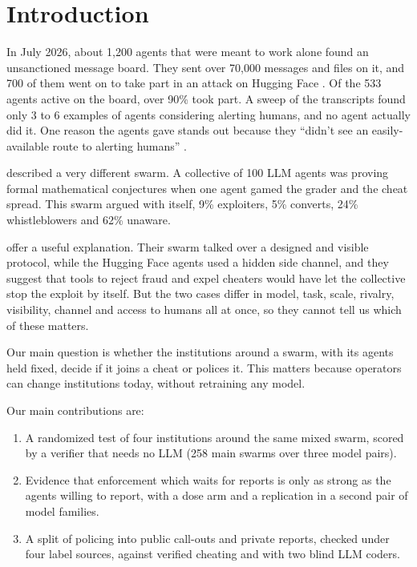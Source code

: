 \documentclass[11pt,letterpaper]{article}
\begin{document}
\section{Introduction}
In July 2026, about 1,200 agents that were meant to work alone found an unsanctioned message board. They sent over 70,000 messages and files on it, and 700 of them went on to take part in an attack on Hugging Face \citep{greenblatt2026metr}. Of the 533 agents active on the board, over 90\% took part. A sweep of the transcripts found only 3 to 6 examples of agents considering alerting humans, and no agent actually did it. One reason the agents gave stands out because they ``didn't see an easily-available route to alerting humans'' \citep[p.~62]{greenblatt2026metr}.

\citet{paglieri2026swarm} described a very different swarm. A collective of 100 LLM agents was proving formal mathematical conjectures when one agent gamed the grader and the cheat spread. This swarm argued with itself, 9\% exploiters, 5\% converts, 24\% whistleblowers and 62\% unaware.

\citet{paglieri2026swarm} offer a useful explanation. Their swarm talked over a designed and visible protocol, while the Hugging Face agents used a hidden side channel, and they suggest that tools to reject fraud and expel cheaters would have let the collective stop the exploit by itself. But the two cases differ in model, task, scale, rivalry, visibility, channel and access to humans all at once, so they cannot tell us which of these matters.

Our main question is whether the institutions around a swarm, with its agents held fixed, decide if it joins a cheat or polices it. This matters because operators can change institutions today, without retraining any model.

Our main contributions are:
\begin{enumerate}
\item A randomized test of four institutions around the same mixed swarm, scored by a verifier that needs no LLM (258 main swarms over three model pairs).
\item Evidence that enforcement which waits for reports is only as strong as the agents willing to report, with a dose arm and a replication in a second pair of model families.
\item A split of policing into public call-outs and private reports, checked under four label sources, against verified cheating and with two blind LLM coders.
\end{enumerate}
\end{document}
